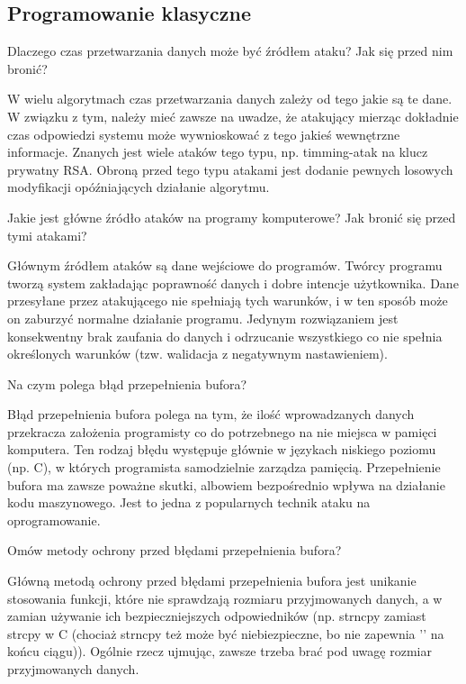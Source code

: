 \documentclass[answers,11pt]{exam}
\begin{document}
\subsection{Programowanie klasyczne}
\begin{questions}

\question Dlaczego czas przetwarzania danych może być źródłem ataku? Jak się przed nim bronić?
\begin{solution}
W wielu algorytmach czas przetwarzania danych zależy od tego jakie są te dane. W związku z tym, należy mieć zawsze na uwadze, że atakujący mierząc dokładnie czas odpowiedzi systemu może wywnioskować z tego jakieś wewnętrzne informacje. Znanych jest wiele ataków tego typu, np. timming-atak na klucz prywatny RSA.
Obroną przed tego typu atakami jest dodanie pewnych losowych modyfikacji opóźniających działanie algorytmu.  
\end{solution}

\question Jakie jest główne źródło ataków na programy komputerowe? Jak bronić się przed tymi atakami?
\begin{solution}
Głównym źródłem ataków są dane wejściowe do programów. Twórcy programu tworzą system zakładając poprawność danych i dobre intencje użytkownika. Dane przesyłane przez atakującego nie spełniają tych warunków, i w ten sposób może on zaburzyć normalne działanie programu. 
Jedynym rozwiązaniem jest konsekwentny brak zaufania do danych i odrzucanie wszystkiego co nie spełnia określonych warunków (tzw. walidacja z negatywnym nastawieniem).
\end{solution}


\question Na czym polega błąd przepełnienia bufora?
\begin{solution}
Błąd przepełnienia bufora polega na tym, że ilość wprowadzanych danych przekracza założenia programisty co do potrzebnego na nie miejsca w pamięci komputera. Ten rodzaj błędu występuje głównie w językach niskiego poziomu (np. C), w których programista samodzielnie zarządza pamięcią. Przepełnienie bufora ma zawsze poważne skutki, albowiem bezpośrednio wpływa na działanie kodu maszynowego. Jest to jedna z popularnych technik ataku na oprogramowanie. 
\end{solution}

\question Omów metody ochrony przed błędami przepełnienia bufora?
\begin{solution}
Główną metodą ochrony przed błędami przepełnienia bufora jest unikanie stosowania funkcji, które nie sprawdzają rozmiaru przyjmowanych danych, a w zamian używanie ich bezpieczniejszych odpowiedników (np. strncpy zamiast strcpy w C (chociaż strncpy też może być niebiezpieczne, bo nie zapewnia '\0' na końcu ciągu)). Ogólnie rzecz ujmując, zawsze trzeba brać pod uwagę rozmiar przyjmowanych danych. 
\end{solution}


\end{questions}
\end{document}
